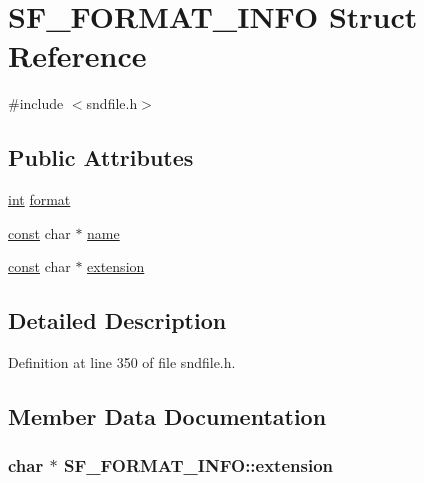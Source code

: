\hypertarget{struct_s_f___f_o_r_m_a_t___i_n_f_o}{}\section{S\+F\+\_\+\+F\+O\+R\+M\+A\+T\+\_\+\+I\+N\+FO Struct Reference}
\label{struct_s_f___f_o_r_m_a_t___i_n_f_o}


{\ttfamily \#include $<$sndfile.\+h$>$}

\subsection*{Public Attributes}
\begin{DoxyCompactItemize}
\item 
\hyperlink{xmltok_8h_a5a0d4a5641ce434f1d23533f2b2e6653}{int} \hyperlink{struct_s_f___f_o_r_m_a_t___i_n_f_o_a8d07503c07b5330c298341ca03859f66}{format}
\item 
\hyperlink{getopt1_8c_a2c212835823e3c54a8ab6d95c652660e}{const} char $\ast$ \hyperlink{struct_s_f___f_o_r_m_a_t___i_n_f_o_af9e33bd709af81d99f3d145d86c41273}{name}
\item 
\hyperlink{getopt1_8c_a2c212835823e3c54a8ab6d95c652660e}{const} char $\ast$ \hyperlink{struct_s_f___f_o_r_m_a_t___i_n_f_o_a0033082d040149bbfa5fdd9f9cf36f3d}{extension}
\end{DoxyCompactItemize}


\subsection{Detailed Description}


Definition at line 350 of file sndfile.\+h.



\subsection{Member Data Documentation}
\subsubsection[{\texorpdfstring{extension}{extension}}]{ char $\ast$ S\+F\+\_\+\+F\+O\+R\+M\+A\+T\+\_\+\+I\+N\+F\+O\+::extension}\hypertarget{struct_s_f___f_o_r_m_a_t___i_n_f_o_a0033082d040149bbfa5fdd9f9cf36f3d}{}\label{struct_s_f___f_o_r_m_a_t___i_n_f_o_a0033082d040149bbfa5fdd9f9cf36f3d}


